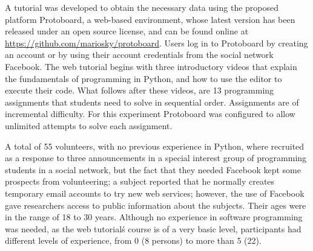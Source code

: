 \documentclass[a4paper,twoside]{article}
\begin{document}
A tutorial was developed to
obtain the necessary data using the proposed platform Protoboard, a web-based environment,
whose latest version has been released under an open source license,
and can be found online at \url{https://github.com/mariosky/protoboard}.
Users log in to 
Protoboard  by creating an account or by using their account credentials from the
social network Facebook. The web tutorial begins with three introductory videos that explain
the fundamentals of programming in Python, and how to use the editor to
execute their code. What follows after these videos, are 13 programming
assignments that students need to solve in sequential order. Assignments are of
incremental difficulty.
For this experiment Protoboard was configured to allow unlimited
attempts to solve each assignment. 

A total of 55 volunteers, with no previous experience in Python, where recruited
as a response to three announcements in a special interest group of programming
students in a social network, but the fact that they needed Facebook kept some prospects from
volunteering; a subject reported that he normally creates temporary email
accounts to try new web services; however, the use of Facebook gave researchers access to public
information about the subjects. Their ages were in the range of 18 to
30 years. Although no experience in software programming was needed, as the
web tutorial\'s course is of a very basic level, participants had
different levels of experience, from 0 (8 persons) to more than 5 (22).

\end{document}
